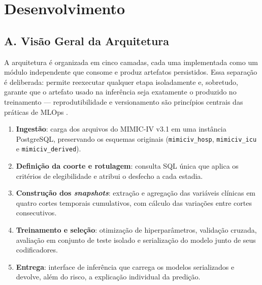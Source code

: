 \documentclass{ieeeaccess}
\begin{document}
\section{Desenvolvimento}

\subsection*{A. Visão Geral da Arquitetura}
A arquitetura é organizada em cinco camadas, cada uma implementada como um módulo independente que consome e produz artefatos persistidos. Essa separação é deliberada: permite reexecutar qualquer etapa isoladamente e, sobretudo, garante que o artefato usado na inferência seja exatamente o produzido no treinamento --- reprodutibilidade e versionamento são princípios centrais das práticas de MLOps \cite{Kreuzberger2023}.

\begin{enumerate}[label=\arabic*.]
\item \textbf{Ingestão}: carga dos arquivos do MIMIC-IV v3.1 \cite{Johnson2023} em uma instância PostgreSQL, preservando os esquemas originais (\texttt{mimiciv\_hosp}, \texttt{mimiciv\_icu} e \texttt{mimiciv\_derived}).
\item \textbf{Definição da coorte e rotulagem}: consulta SQL única que aplica os critérios de elegibilidade e atribui o desfecho a cada estadia.
\item \textbf{Construção dos \textit{snapshots}}: extração e agregação das variáveis clínicas em quatro cortes temporais cumulativos, com cálculo das variações entre cortes consecutivos.
\item \textbf{Treinamento e seleção}: otimização de hiperparâmetros, validação cruzada, avaliação em conjunto de teste isolado e serialização do modelo junto de seus codificadores.
\item \textbf{Entrega}: interface de inferência que carrega os modelos serializados e devolve, além do risco, a explicação individual da predição.
\end{enumerate}

\end{document}
